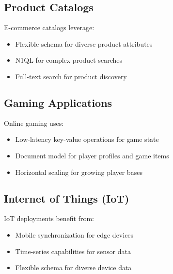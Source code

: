 \subsection{Product Catalogs}
E-commerce catalogs leverage:
\begin{itemize}
  \item Flexible schema for diverse product attributes
  \item N1QL for complex product searches
  \item Full-text search for product discovery
\end{itemize}

\subsection{Gaming Applications}
Online gaming uses:
\begin{itemize}
  \item Low-latency key-value operations for game state
  \item Document model for player profiles and game items
  \item Horizontal scaling for growing player bases
\end{itemize}

\subsection{Internet of Things (IoT)}
IoT deployments benefit from:
\begin{itemize}
  \item Mobile synchronization for edge devices
  \item Time-series capabilities for sensor data
  \item Flexible schema for diverse device data
\end{itemize}
